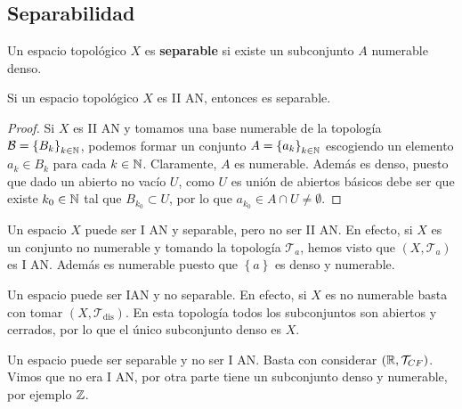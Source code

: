 \subsection{Separabilidad}
\begin{definition}
Un espacio topológico $\displaystyle X $ es \textbf{separable} si existe un subconjunto $\displaystyle A $ numerable denso.
\end{definition}
\begin{prop}
Si un espacio topológico $\displaystyle X $ es II AN, entonces es separable. 
\end{prop}
\begin{proof}
	Si $\displaystyle X $ es II AN y tomamos una base numerable de la topología $\displaystyle \mathcal{B} = \left\{ B_{k}\right\} _{k \in \mathbb{N}} $, podemos formar un conjunto $\displaystyle A = \left\{ a_{k}\right\} _{k \in \mathbb{N}} $ escogiendo un elemento $\displaystyle a_{k}\in B_{k} $ para cada $\displaystyle k \in \mathbb{N} $. Claramente, $\displaystyle A $ es numerable. Además es denso, puesto que dado un abierto no vacío $\displaystyle U $, como $\displaystyle U $ es unión de abiertos básicos debe ser que existe $\displaystyle k_{0}\in \mathbb{N} $ tal que $\displaystyle B_{k_{0}}\subset U $, por lo que $\displaystyle a_{k_{0}}\in A\cap U \neq \emptyset$.
\end{proof}
\begin{eg}
	Un espacio $\displaystyle X $ puede ser I AN y separable, pero no ser II AN. En efecto, si $\displaystyle X $ es un conjunto no numerable y tomando la topología $\displaystyle \mathcal{T}_{a} $, hemos visto que $\displaystyle \left(X, \mathcal{T}_{a}\right) $ es I AN. Además es numerable puesto que $\displaystyle \left\{ a\right\}  $ es denso y numerable. 
\end{eg}
\begin{eg}
Un espacio puede ser IAN y no separable. En efecto, si $\displaystyle X $ es no numerable basta con tomar $\displaystyle \left(X, \mathcal{T}_{\text{dis}}\right) $. En esta topología todos los subconjuntos son abiertos y cerrados, por lo que el único subconjunto denso es $\displaystyle X $.
\end{eg}
\begin{eg}
Un espacio puede ser separable y no ser I AN. Basta con considerar $\displaystyle \left(\mathbb{R}, \mathcal{T}_{CF}\right) $. Vimos que no era I AN, por otra parte tiene un subconjunto denso y numerable, por ejemplo $\displaystyle \mathbb{Z} $.
\end{eg}
